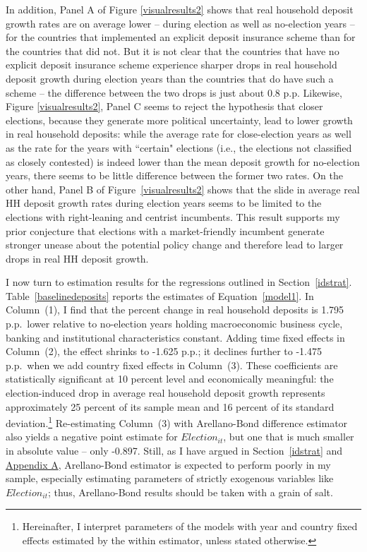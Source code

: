 \documentclass[12pt,a4paper]{article}
\begin{document}
In addition, Panel A of Figure \ref{visualresults2} shows that real household deposit growth rates are on average lower  -- during election as well as no-election years -- for the countries that implemented an explicit deposit insurance scheme than for the countries that did not. But it is not clear that the countries that have no explicit deposit insurance scheme experience sharper drops in real household deposit growth during election years than the countries that do have such a scheme -- the difference between the two drops is just about 0.8 p.p. Likewise, Figure \ref{visualresults2}, Panel C seems to reject the hypothesis that closer elections, because they generate more political uncertainty, lead to lower growth in real household deposits: while the average rate for close-election years as well as the rate for the years with ``certain" elections (i.e., the elections not classified as closely contested) is indeed lower than the mean deposit growth for no-election years, there seems to be little difference between the former two rates. On the other hand, Panel B of Figure~\ref{visualresults2} shows that the slide in average real HH deposit growth rates during election years seems to be limited to the elections with right-leaning and centrist incumbents. This result supports my prior conjecture that elections with a market-friendly incumbent generate stronger unease about the potential policy change and therefore lead to larger drops in real HH deposit growth.

I now turn to estimation results for the regressions outlined in Section~\ref{idstrat}. Table~\ref{baselinedeposits} reports the estimates of Equation~\ref{model1}. In Column~(1), I find that the percent change in real household deposits is 1.795 p.p.\ lower relative to no-election years holding macroeconomic business cycle, banking and institutional characteristics constant. Adding time fixed effects in Column~(2), the effect shrinks to -1.625 p.p.; it declines further to -1.475 p.p.\ when we add country fixed effects in Column~(3). These coefficients are statistically significant at 10 percent level and economically meaningful: the election-induced drop in average real household deposit growth represents approximately 25 percent of its sample mean and 16 percent of its standard deviation.\footnote{Hereinafter, I interpret parameters of the models with year and country fixed effects estimated by the within estimator, unless stated otherwise.} Re-estimating Column~(3) with Arellano-Bond difference estimator also yields a negative point estimate for $Election_{it}$, but one that is much smaller in absolute value -- only -0.897. Still, as I have argued in Section~\ref{idstrat} and \hyperlink{appendixA}{Appendix A}, Arellano-Bond estimator is expected to perform poorly in my sample, especially estimating parameters of strictly exogenous variables like $Election_{it}$; thus, Arellano-Bond results should be taken with a grain of salt.
\end{document}
